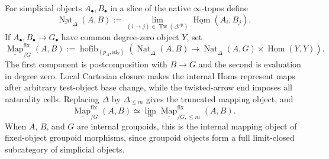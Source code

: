 \begin{construction}
\label{constr:prequantum-internal-fixed-groupoid-mapping-object}
For simplicial objects $A_\bullet,B_\bullet$ in a slice of the native
$\infty$-topos define
\[
\underline{\operatorname{Nat}}_\Delta(A,B)
:=
\lim_{(i\to j)\in\operatorname{Tw}(\Delta^{\mathrm{op}})}
\underline{\operatorname{Hom}}(A_i,B_j).
\]
If $A_\bullet,B_\bullet\to G_\bullet$ have common degree-zero object $Y$, set
\[
\boxed{
\underline{\operatorname{Map}}^{\mathrm{fix}}_{/G}(A,B)
:=
\operatorname{hofib}_{(p_A,\mathrm{id}_Y)}
\left(
\underline{\operatorname{Nat}}_\Delta(A,B)
\longrightarrow
\underline{\operatorname{Nat}}_\Delta(A,G)
\times
\underline{\operatorname{Hom}}(Y,Y)
\right).
}
\]
The first component is postcomposition with $B\to G$ and the second is
evaluation in degree zero.  Local Cartesian closure makes the internal Homs
represent maps after arbitrary test-object base change, while the twisted-arrow
end imposes all naturality cells.  Replacing $\Delta$ by
$\Delta_{\le m}$ gives the truncated mapping object, and
\[
\underline{\operatorname{Map}}^{\mathrm{fix}}_{/G}(A,B)
\simeq
\lim_m
\underline{\operatorname{Map}}^{\mathrm{fix}}_{/G,\le m}(A,B).
\]
When $A$, $B$, and $G$ are internal groupoids, this is the internal mapping
object of fixed-object groupoid morphisms, since groupoid objects form a full
limit-closed subcategory of simplicial objects.
\end{construction}

